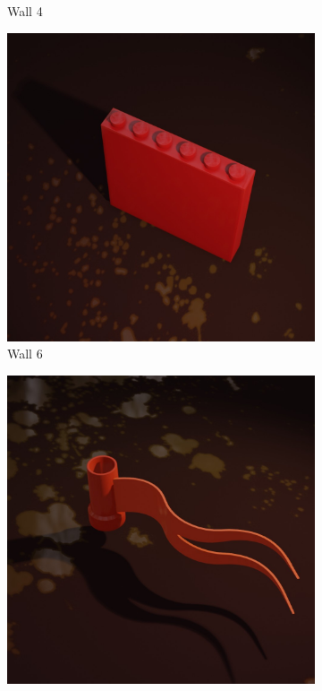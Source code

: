 \documentclass[]{article}
\begin{document}
\begin{figure}[h]
\begin{subfigure}[b]{0.15\textwidth}
        \caption{Wall 4}\par\medskip
    \end{subfigure}\par\medskip
    \begin{subfigure}[b]{0.15\textwidth}
        \centering
        \includegraphics[width=\textwidth]{Examples/wall-6.jpg}
        \caption{Wall 6}
    \end{subfigure}
    \begin{subfigure}[b]{0.15\textwidth}
        \centering
        \includegraphics[width=\textwidth]{Examples/flag.jpg}

\end{subfigure}
\end{figure}
\end{document}
